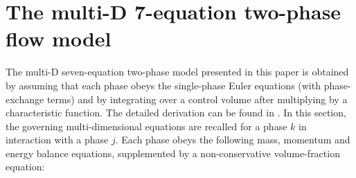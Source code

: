 \documentclass[preprint,10pt]{elsarticle}
\begin{document}
\section{The multi-D 7-equation two-phase flow model}\label{sec:7-equ-model}
%
The multi-D seven-equation two-phase model presented in this paper is obtained by assuming that each phase obeys the single-phase Euler equations (with phase-exchange terms) and by integrating over a control volume after multiplying by a characteristic function. The detailed derivation can be found in \cite{SEM}. In this section, the governing multi-dimensional equations are recalled for a phase $k$ in interaction with a phase $j$. Each phase obeys the following mass, momentum and energy balance equations, supplemented by a non-conservative volume-fraction equation:
%
\end{document}
